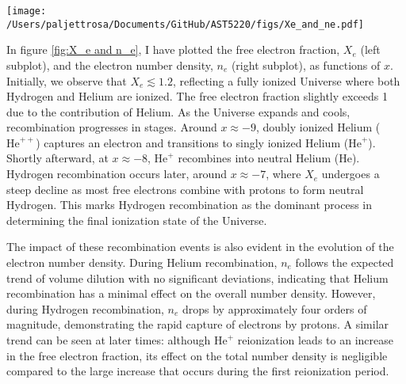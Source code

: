 \documentclass{aa}
\numberwithin{equation}{section}
\numberwithin{table}{section}
\numberwithin{figure}{section}
\begin{document}
\begin{figure*}
  \centering
  \texttt{[image: /Users/paljettrosa/Documents/GitHub/AST5220/figs/Xe\_and\_ne.pdf]}
  \caption{The evolution of the free electron fraction $X_e$ (left) and the free electron number density $n_e$ (right) as functions of $x = \log(a)$. The dashed blue line marks the time of recombination estimated using only the Saha approximation, while the solid line shows the result from solving the Peebles equation. The significant difference illustrates the limitations of assuming equilibrium. 
  }\label{fig:X_e and n_e}
\end{figure*}

In figure \ref{fig:X_e and n_e}, I have plotted the free electron fraction, $X_e$ (left subplot), and the electron number density, $n_e$ (right subplot), as functions of $x$. Initially, we observe that $X_e \lesssim 1.2$, reflecting a fully ionized Universe where both Hydrogen and Helium are ionized. The free electron fraction slightly exceeds 1 due to the contribution of Helium. As the Universe expands and cools, recombination progresses in stages. Around $x \approx -9$, doubly ionized Helium ($\text{He}^{++}$) captures an electron and transitions to singly ionized Helium ($\text{He}^+$). Shortly afterward, at $x \approx -8$, $\text{He}^{+}$ recombines into neutral Helium ($\text{He}$). Hydrogen recombination occurs later, around $x \approx -7$, where $X_e$ undergoes a steep decline as most free electrons combine with protons to form neutral Hydrogen. This marks Hydrogen recombination as the dominant process in determining the final ionization state of the Universe.

The impact of these recombination events is also evident in the evolution of the electron number density. During Helium recombination, $n_e$ follows the expected trend of volume dilution with no significant deviations, indicating that Helium recombination has a minimal effect on the overall number density. However, during Hydrogen recombination, $n_e$ drops by approximately four orders of magnitude, demonstrating the rapid capture of electrons by protons. A similar trend can be seen at later times: although $\text{He}^{+}$ reionization leads to an increase in the free electron fraction, its effect on the total number density is negligible compared to the large increase that occurs during the first reionization period.
\end{document}
